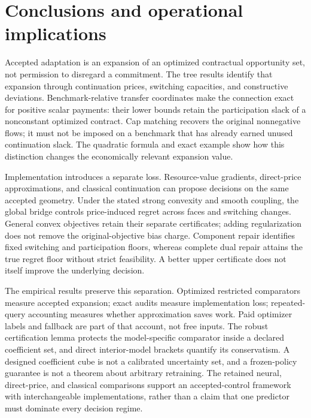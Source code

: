 \section{Conclusions and operational implications}
Accepted adaptation is an expansion of an optimized contractual opportunity
set, not permission to disregard a commitment. The tree results identify that
expansion through continuation prices, switching capacities, and constructive
deviations. Benchmark-relative transfer coordinates make the connection exact
for positive scalar payments: their lower bounds retain the participation
slack of a nonconstant optimized contract. Cap matching recovers the original
nonnegative flows; it must not be imposed on a benchmark that has already
earned unused continuation slack. The quadratic formula and exact example show
how this distinction changes the economically relevant expansion value.

Implementation introduces a separate loss. Resource-value gradients,
direct-price approximations, and classical continuation can propose decisions
on the same accepted geometry. Under the stated strong convexity and smooth
coupling, the global bridge controls price-induced regret across faces and
switching changes. General convex objectives retain their separate certificates;
adding regularization does not remove the original-objective bias charge.
Component repair identifies fixed switching and participation floors, whereas
complete dual repair attains the true regret floor without strict feasibility.
A better upper certificate does not itself improve the underlying decision.

The empirical results preserve this separation. Optimized restricted
comparators measure accepted expansion; exact audits measure implementation
loss; repeated-query accounting measures whether approximation saves work.
Paid optimizer labels and fallback are part of that account, not free inputs.
The robust certification lemma protects the model-specific comparator inside a
declared coefficient set, and direct interior-model brackets quantify its
conservatism. A designed coefficient cube is not a calibrated uncertainty set,
and a frozen-policy guarantee is not a theorem about arbitrary retraining.
The retained neural, direct-price, and classical comparisons support an
accepted-control framework with interchangeable implementations, rather than a
claim that one predictor must dominate every decision regime.
